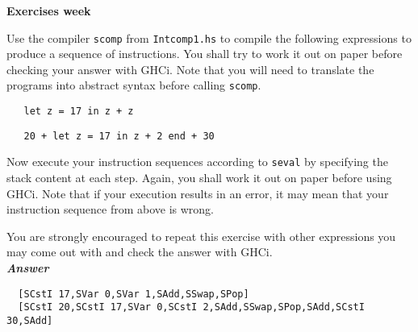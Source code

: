\documentclass[a4paper]{article}
\begin{document}
\begin{center}
{\Large\bf Exercises week }\\[1ex]
\end{center}






\begin{exercise} 
Use the compiler \texttt{scomp} from \texttt{Intcomp1.hs} to compile the following 
expressions to produce a sequence of instructions. You shall try to work it out on paper before checking your answer with GHCi. 
Note that you will need to translate the programs into abstract syntax before calling \texttt{scomp}. 

{\codesetup\begin{verbatim}
   let z = 17 in z + z
\end{verbatim}}

{\codesetup\begin{verbatim}
   20 + let z = 17 in z + 2 end + 30
\end{verbatim}}

Now execute your instruction sequences according to \texttt{seval} by specifying the stack content at each step. Again, you shall work 
it out on paper before using GHCi. Note that if your execution results in an error, 
it may mean that your instruction sequence from above is wrong. 

You are strongly encouraged to repeat this exercise with other expressions you may come out with and check the answer with GHCi.\\

  \noindent
\textbf{\emph{Answer}}
  {\codesetup\begin{verbatim}
  [SCstI 17,SVar 0,SVar 1,SAdd,SSwap,SPop]
  [SCstI 20,SCstI 17,SVar 0,SCstI 2,SAdd,SSwap,SPop,SAdd,SCstI 30,SAdd]
  \end{verbatim}}

\end{exercise}
\end{document}
